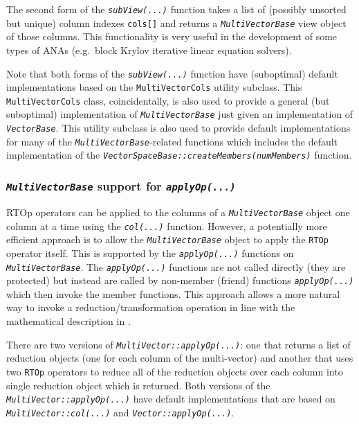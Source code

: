 \documentclass[pdf,ps2pdf,11pt]{SANDreport}
\begin{document}
The second form of the {}\texttt{\textit{subView(...)}} function takes a
list of (possibly unsorted but unique) column indexes
{}\texttt{cols[]} and returns a {}\texttt{\textit{Multi\-Vector\-Base}} view
object of those columns.  This functionality is very useful in the
development of some types of ANAs (e.g.~block Krylov iterative linear
equation solvers).

Note that both forms of the {}\texttt{\textit{subView(...)}} function
have (suboptimal) default implementations based on the
{}\texttt{MultiVectorCols} utility subclass.  This
{}\texttt{MultiVectorCols} class, coincidentally, is also used to
provide a general (but suboptimal) implementation of
{}\texttt{\textit{Multi\-Vector\-Base}} just given an implementation of
{}\texttt{\textit{Vector\-Base}}.  This utility subclass is also used to
provide default implementations for many of the
{}\texttt{\textit{Multi\-Vector\-Base}}-related functions which includes the
default implementation of the
{}\texttt{\textit{Vector\-Space\-Base\-::createMembers(numMembers)}} function.

%
\subsubsection{\texttt{\textit{Multi\-Vector\-Base}} support for {}\texttt{\textit{applyOp(\-...)}}}
\label{tsfcore:sec:multi_vec_apply_op}
%

RTOp operators can be applied to the columns of a
{}\texttt{\textit{Multi\-Vector\-Base}} object one column at a time using
the {}\texttt{\textit{col(...)}} function.  However, a potentially more
efficient approach is to allow the {}\texttt{\textit{Multi\-Vector\-Base}}
object to apply the {}\texttt{RTOp} operator itself.  This is
supported by the {}\texttt{\textit{applyOp(\-...)}} functions on
{}\texttt{\textit{Multi\-Vector\-Base}}.  The
{}\texttt{\textit{applyOp(\-...)}} functions are not called directly
(they are protected) but instead are called by non-member (friend)
functions {}\texttt{\textit{applyOp(\-...)}} which then invoke the
member functions.  This approach allows a more natural way to invoke a
reduction/transformation operation in line with the mathematical
description in {}\cite{ref:rtop_toms}.

There are two versions of
{}\texttt{\textit{Multi\-Vector\-::applyOp(\-...)}}: one that returns
a list of reduction objects (one for each column of the multi-vector)
and another that uses two {}\texttt{RTOp} operators to reduce all of
the reduction objects over each column into single reduction object
which is returned.  Both versions of the
{}\texttt{\textit{Multi\-Vector\-::applyOp(\-...)}} have default
implementations that are based on
{}\texttt{\textit{Multi\-Vector\-::col(...)}} and
{}\texttt{\textit{Vector\-::applyOp(\-...)}}.
\end{document}
